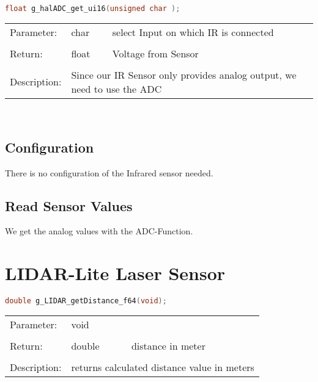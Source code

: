 \begin{lstlisting}[language=C, basicstyle=\small, caption=Read Infrared]
float g_halADC_get_ui16(unsigned char );
\end{lstlisting}

\begin{tabular}{lll}
Parameter: & char & select Input on which IR is connected\\
					 &	\\
Return: & float & Voltage from Sensor\\
							&&\\
Description: & \multicolumn{2}{l}{Since our IR Sensor only provides analog output, we need to use the ADC}\\
\end{tabular}
\\



\subsection{Configuration}

There is no configuration of the Infrared sensor needed.

\subsection{Read Sensor Values}

We get the analog values with the ADC-Function.





\section{LIDAR-Lite Laser Sensor}








\begin{lstlisting}[language=C, basicstyle=\small, caption=get Laser Distance]
double g_LIDAR_getDistance_f64(void);
\end{lstlisting}

\begin{tabular}{lll}
Parameter: & void & \\
					 &	\\
Return: & double & distance in meter\\
							&&\\
Description: & \multicolumn{2}{l}{returns calculated distance value in meters}\\
\end{tabular}
\\


